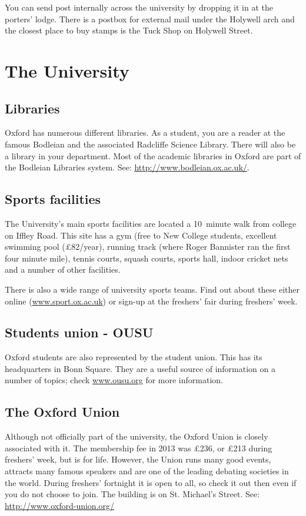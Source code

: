 \documentclass[a4paper,fleqn,12pt]{book} %
\begin{document}
You can send post internally across the university by dropping it in at the porters' lodge. There is a postbox for external mail under the Holywell arch and the closest place to buy stamps is the Tuck Shop on Holywell Street.

\section{The University}

\subsection{Libraries}
Oxford has numerous different libraries. As a student, you are a reader at the
famous Bodleian and the associated Radcliffe Science Library. There will also be
a library in your department. Most of the academic libraries in Oxford are part of the Bodleian Libraries system. See: \url{http://www.bodleian.ox.ac.uk/}.

\subsection{Sports facilities}
The University's main sports facilities are located a 10~minute walk from
college on Iffley Road. This site has a gym (free to New College students, excellent swimming pool (\pounds82/year), running track (where Roger Bannister ran the first four minute mile), tennis courts, squash courts, sports hall, indoor cricket nets and a number of other facilities.

There is also a wide range of university sports teams. Find out about these
either online (\url{www.sport.ox.ac.uk}) or sign-up at the freshers' fair during
freshers' week.
\subsection{Students union - OUSU}
Oxford students are also represented by the student union. This has its
headquarters in Bonn Square. They are a useful source of information on a number
of topics; check \url{www.ousu.org} for more information.
\subsection{The Oxford Union}
Although not officially part of the university, the Oxford Union is closely
associated with it. The membership fee in 2013 was \pounds236, or \pounds213 during freshers'
week, but is for life. However, the Union runs many good events, attracts many
famous speakers and are one of the leading debating societies in the world. During freshers' fortnight it is open to all, so check it out then even if you do not choose to join. The building is on St. Michael's Street. See: \url{http://www.oxford-union.org/}
\end{document}
